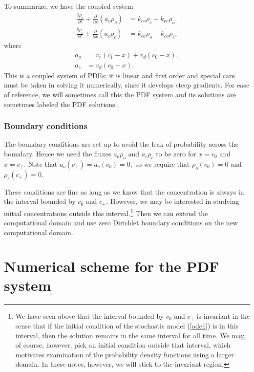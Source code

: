 To summarize, we have the coupled system%
\begin{align}
\frac{\partial\rho_{o}}{\partial t}+\frac{\partial}{\partial x}\left(
a_{o}\rho_{o}\right)   &  =k_{co}\rho_{c}-k_{oc}\rho_{o}, \label{pdfsystem}\\
\frac{\partial\rho_{c}}{\partial t}+\frac{\partial}{\partial x}\left(
a_{c}\rho_{c}\right)   &  =k_{oc}\rho_{o}-k_{co}\rho_{c}, \nonumber
\end{align}
where 
\begin{align}
a_{o} &  =v_{r}(c_{1}-x)+v_{d}(c_{0}-x),\\
a_{c} &  =v_{d}(c_{0}-x).\nonumber
\end{align}
This is a coupled system of PDEs; it is linear and
first order and special care must be taken in solving it numerically, since it
develops steep gradients. For ease of reference, we will sometimes call this the PDF system
and its solutions are sometimes labeled the PDF solutions.

\subsubsection{Boundary conditions \label{bc}}

The boundary conditions are set up to avoid the leak of probability across the
boundary. Hence we need the fluxes $a_{o}\rho_{o}$ and $a_{c}\rho_{c}$
to be zero for $x=c_{0}$ and $x=c_{+}.$ Note that $a_{o}(c_{+})=a_{c}%
(c_{0})=0,$ so we require that $\rho_{o}(c_{0})=0$ and $\rho_{c}(c_{+})=0.$

These conditions are fine as long as we know that the concentration is always in the interval
bounded by $c_0$ and $c_+$. However, we may be interested in studying initial concentrations outside this interval.\footnote{We have seen above that the 
interval bounded by $c_0$ and $c_+$ is invariant in the sense that if the initial condition of the stochastic model
(\ref{ode1}) is in this interval, then the solution remains in the same interval for all time. We may, of course, however, pick an initial condition outside
that interval, which motivates examination of the probability density functions using a larger domain. In these notes, however, we will stick
to the invariant region.} Then we can 
extend the computational domain and use zero Dirichlet boundary conditions on the new computational domain.


\section{Numerical scheme for the PDF system \label{npdf}}

